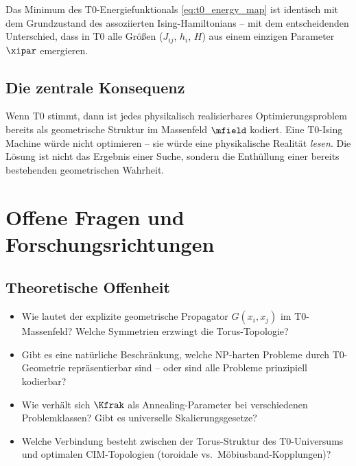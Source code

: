 Das Minimum des T0-Energiefunktionals \eqref{eq:t0_energy_map} ist identisch mit 
dem Grundzustand des assoziierten Ising-Hamiltonians -- mit dem entscheidenden 
Unterschied, dass in T0 alle Größen ($J_{ij}$, $h_i$, $H$) aus einem einzigen 
Parameter $\xipar$ emergieren.

\subsection{Die zentrale Konsequenz}

\begin{revolutionary}
    Wenn T0 stimmt, dann ist jedes physikalisch realisierbares Optimierungsproblem 
    bereits als geometrische Struktur im Massenfeld $\mfield$ kodiert. Eine 
    T0-Ising Machine würde nicht optimieren -- sie würde eine physikalische Realität 
    \emph{lesen}. Die Lösung ist nicht das Ergebnis einer Suche, sondern die 
    Enthüllung einer bereits bestehenden geometrischen Wahrheit.
\end{revolutionary}

\clearpage

\section{Offene Fragen und Forschungsrichtungen}
\label{sec:questions}

\subsection{Theoretische Offenheit}

\begin{itemize}
    \item Wie lautet der explizite geometrische Propagator $G(x_i, x_j)$ 
    im T0-Massenfeld? Welche Symmetrien erzwingt die Torus-Topologie?
    
    \item Gibt es eine natürliche Beschränkung, welche NP-harten Probleme 
    durch T0-Geometrie repräsentierbar sind -- oder sind alle Probleme 
    prinzipiell kodierbar?
    
    \item Wie verhält sich $\Kfrak$ als Annealing-Parameter bei verschiedenen 
    Problemklassen? Gibt es universelle Skalierungsgesetze?
    
    \item Welche Verbindung besteht zwischen der Torus-Struktur des T0-Universums 
    und optimalen CIM-Topologien (toroidale vs.\ Möbiusband-Kopplungen)?
\end{itemize}

